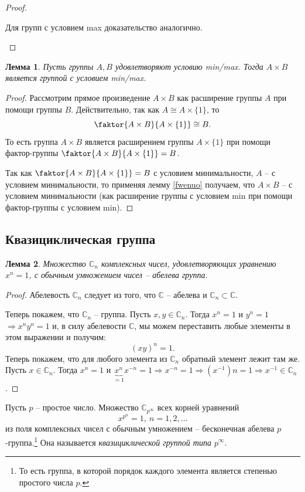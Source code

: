 \documentclass{article}
\newtheorem{lemma}{Лемма}[section]
\begin{document}
\begin{proof}
\begin{enumerate}
        Для групп с условием max доказательство аналогично.
    \end{enumerate}
\end{proof}

\begin{lemma} \label{cweruinop}
    Пусть группы $A, B$ удовлетворяют условию min/max. Тогда $A \times B$ является группой с условием min/max.
\end{lemma}
\begin{proof}
    Рассмотрим прямое произведение $A \times B$ как расширение группы $A$ при помощи группы $B$. Действительно, так как $A \cong A \times \{ 1 \}$, то $$ \faktor{A \times B}{A \times \{ 1 \}} \cong B. $$
    То есть группа $A \times B$ является расширением группы $A \times \{ 1 \}$ при помощи фактор-группы $\faktor{A \times B}{ A \times \{ 1 \}} = B$.
    
    Так как $\faktor{A \times B}{ A \times \{ 1 \}} = B$ с условием минимальности, $A$ -- с условием минимальности, то применяя лемму \ref{fwenuo} получаем, что $A \times B$ -- с условием минимальности (как расширение группы с условием min при помощи фактор-группы с условием min).
\end{proof}

\subsection{Квазициклическая группа}

\begin{lemma}
    Множество $\mathbb{C}_n$ комплексных чисел, удовлетворяющих уравнению $x^n = 1$, с обычным умножением чисел -- абелева группа.
\end{lemma}
\begin{proof}
    Абелевость $\mathbb{C}_n$ следует из того, что $\mathbb{C}$ -- абелева и $\mathbb{C}_n \subset \mathbb{C}$.
    
    Теперь покажем, что $\mathbb{C}_n$ -- группа. Пусть $x, y \in \mathbb{C}_n$. Тогда $x^n = 1$ и $y^n = 1$ $\Rightarrow x^n y^n = 1$ и, в силу абелевости $\mathbb{C}$, мы можем переставить любые элементы в этом выражении и получим: $$ (xy)^n = 1. $$
    Теперь покажем, что для любого элемента из $\mathbb{C}_n$ обратный элемент лежит там же. Пусть $x \in \mathbb{C}_n$. Тогда $x^n = 1$ и $ \underbrace{x^n}_{=1} x^{-n} = 1 \Rightarrow x^{-n} = 1 \Rightarrow (x^{-1})n = 1  \Rightarrow x^{-1} \in \mathbb{C}_n$.
\end{proof}

Пусть $p$ -- простое число. Множество $\mathbb{C}_{p^{\infty}}$ всех корней уравнений $$ x^{p^n} = 1, \ n = 1,2,\ldots $$ из поля комплексных чисел с обычным умножением -- бесконечная абелева $p$-группа.\footnote{То есть группа, в которой порядок каждого элемента является степенью простого числа $p$.} Она называется \textit{квазициклической группой типа $p^{\infty}$}.
\end{document}
